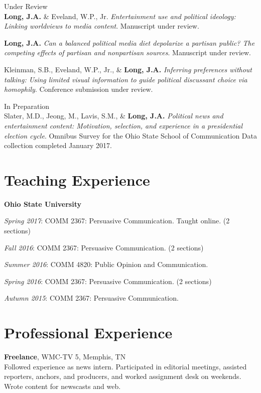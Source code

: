 \documentclass[margin,line]{res}
\begin{document}
\begin{resume}
{\sc Under Review}\\
\textbf{Long, J.A.} \& Eveland, W.P., Jr. \emph{Entertainment use and political ideology: Linking worldviews to media content}. Manuscript under review.

\textbf{Long, J.A.} \emph{Can a balanced political media diet depolarize a partisan public? The competing effects of partisan and nonpartisan sources}. Manuscript under review.

Kleinman, S.B., Eveland, W.P., Jr., \& \textbf{Long, J.A.} \emph{Inferring preferences without talking: Using limited visual information to guide political discussant choice via homophily}. Conference submission under review.

{\sc In Preparation}\\
Slater, M.D., Jeong, M., Lavis, S.M., \& {\bf Long, J.A.} \emph{Political news and entertainment content: Motivation, selection, and experience in a presidential election cycle}. Omnibus Survey for the Ohio State School of Communication Data collection completed January 2017. 



\section{\sc Teaching Experience}
{\bf Ohio State University}

\vspace*{-2.5mm}
\emph{Spring 2017}: COMM 2367: Persuasive Communication. Taught online. (2 sections)

\vspace*{-2.5mm}
\emph{Fall 2016}: COMM 2367: Persuasive Communication. (2 sections)

\vspace*{-2.5mm}
\emph{Summer 2016}: COMM 4820: Public Opinion and Communication.

\vspace*{-2.5mm}
\emph{Spring 2016}: COMM 2367: Persuasive Communication. (2 sections)

\vspace*{-2.5mm}
\emph{Autumn 2015}: COMM 2367: Persuasive Communication.

\section{\sc Professional Experience}
{\bf Freelance}, WMC-TV 5, Memphis, TN\\
Followed experience as news intern. Participated in editorial meetings, assisted reporters, anchors, and producers, and worked assignment desk on weekends. Wrote content for newscasts and web.


\end{resume}
\end{document}
